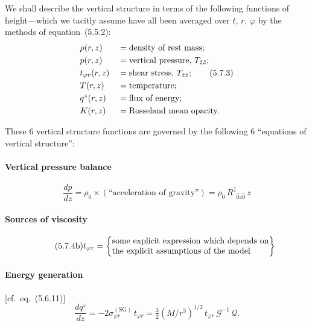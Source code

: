 We shall describe the vertical structure in terms of the following functions of
height---which we tacitly assume have all been averaged over $t$, $r$, $\varphi$ by the
methods of equation~(5.5.2):
%
\begin{alignat}{2}
&\rho(r,z) &&= \text{density of rest mass;} \notag \\
&p(r,z)   &&= \text{vertical pressure, } T_{\hat{z}\hat{z}}; \notag \\
&t_{\varphi r}(r,z) &&= \text{shear stress, } T_{\hat{z}\hat{z}}; \tag{5.7.3} \\
&T(r,z)   &&= \text{temperature;} \notag \\
&q^z(r,z) &&= \text{flux of energy;} \notag \\
&K(r,z)   &&= \text{Rosseland mean opacity.} \notag
\end{alignat}

These 6 vertical structure functions are governed by the following 6 ``equations
of vertical structure'':

\paragraph{Vertical pressure balance}
%
\begin{equation}
\tag{5.7.4a}
\frac{dp}{dz}
= \rho_0 \times (\text{``acceleration of gravity''})
= \rho_0\, R^{\hat{z}}{}_{\hat{0}\hat{z}\hat{0}}\, z
\end{equation}

\paragraph{Sources of viscosity}
%
\begin{equation}
\tag{5.7.4b}
t_{\varphi r}
= \left\{
    \begin{tabular}{@{}l@{}}
    some explicit expression which depends on\\
    the explicit assumptions of the model
    \end{tabular}
  \right\}
\end{equation}

\paragraph{Energy generation}
[cf.\ eq.~(5.6.11)]
%
\begin{equation}
\tag{5.7.4c}
\frac{dq^z}{dz}
= -2\sigma^{(\mathrm{SG})}_{\varphi r}\, t_{\varphi r}
= \tfrac{3}{2}(M/r^3)^{1/2}\, t_{\varphi r}\,
  \mathscr{G}^{-1}\,\mathscr{Q}.
\end{equation}

